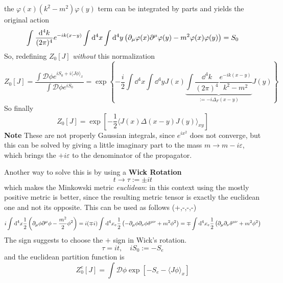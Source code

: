 the $\varphi(x)(k^2-m^2)\varphi(y)$ term can be integrated by parts and yields
the original action
\[
    \int_{}^{} \frac{\dd^4k}{(2\pi)^4}e^{-ik(x-y)}\int\dd^4x\int\dd^4y
\left(\partial_\mu\varphi(x)\partial^\mu\varphi(y) - m^2\varphi(x)\varphi(y)\right)=
S_0
\]
So, redefining $Z_0[J]$ \textit{without} this normalization
\[
    Z_0[J] = \frac{\int \mathcal{D}\phi e^{iS_0+i\langle J\phi\rangle_x}}{
        \int \mathcal{D}\phi e^{iS_0}
    }=
    \exp\left\{ -\frac{i}{2}\int \dd^4x\int\dd^4y J(x)
    \underbrace{\int\frac{\dd^4k}{(2\pi)^4}
    \frac{e^{-ik(x-y)}}{k^2-m^2}}_{:=-i\Delta_F(x-y)}J(y)\right\}
\]
So finally
\[
\boxed{Z_0[J]=\exp\left[-\frac{1}{2}\langle J(x)\Delta(x-y)J(y)\rangle_{xy}
\right]}
\]
\textbf{Note} These are not properly Gaussian integrals, since $e^{ix^2}$ does not
converge, but this can be solved by giving a little imaginary part to the mass
$m\to m-i\varepsilon$, which brings the $+i\varepsilon$ to the denominator of the
propagator.

Another way to solve this is by using a \textbf{Wick Rotation}
\[
t\to\tau:=\pm it
\]
which makes the Minkowski metric \textit{euclidean}: in this context using the
mostly positive metric is better, since the resulting metric tensor is exactly
the euclidean one and not its opposite. This can be used as follows (+,-,-,-)
\[
i\int\dd^4x\frac{1}{2}\left(\partial_\mu\phi\partial^\mu\phi - \frac{m^2}{2}\phi^2\right)=
i(\mp i)\int_{}^{} \dd^4x_e\frac{1}{2}\left(-\partial_\mu\phi\partial_\nu\phi
\delta^{\mu\nu}+m^2\phi^2\right) = \mp\int\dd^4x_e\frac{1}{2}\left(\partial_\mu\partial_\nu
\delta^{\mu\nu}+m^2\phi^2\right)
\]
The sign suggests to choose the $+$ sign in Wick's rotation.
\[
\tau=it,\quad iS_0:=-S_e
\]
and the euclidean partition function is
\[
    Z_0^e[J]=\int \mathcal{D}\phi \exp\left[ -S_e -\langle J\phi\rangle_x \right]
\]

